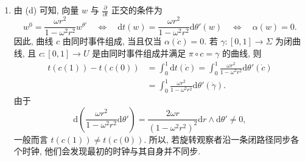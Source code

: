 \begin{description}[font=\normalfont,leftmargin=2em,labelwidth=1.5em]
\begin{enumerate}[label=(\alph*),ref=\alph*,leftmargin=*]
\item 由 (d) 可知, 向量 $w$ 与 $\frac{\partial}{\partial t}$ 正交的条件为
\[
  w^0=\frac{\omega r^2}{1-\omega^2r^2}w^{\theta'}
  \quad\Longleftrightarrow\quad \mathrm{d}t(w)=\frac{\omega r^2}{1-\omega^2r^2}\mathrm{d}\theta'(w)
  \quad\Longleftrightarrow\quad\alpha(w)=0.
\]
因此, 曲线 $c$ 由同时事件组成, 当且仅当 $\alpha(\dot c)=0$. 若 $\gamma:[0,1]\to\Sigma$ 为闭曲线, 且 $c:[0,1]\to U$ 是由同时事件组成并满足 $\pi\circ c=\gamma$ 的曲线, 则
\begin{align*}
  t(c(1))-t(c(0))
    &=\int_0^1\mathrm{d}t(\dot c)
      =\int_0^1\frac{\omega r^2}{1-\omega^2r^2}\mathrm{d}\theta'(\dot c)\\
    &=\int_0^1\frac{\omega r^2}{1-\omega^2r^2}\mathrm{d}\theta'(\dot\gamma).
\end{align*}
由于
\[
  \mathrm{d}\left(\frac{\omega r^2}{1-\omega^2r^2}\mathrm{d}\theta'\right)
  =\frac{2\omega r}{(1-\omega^2r^2)^2}\mathrm{d}r\wedge\mathrm{d}\theta'\ne 0,
\]
一般而言 $t(c(1))\ne t(c(0))$. 所以, 若旋转观察者沿一条闭路径同步各个时钟, 他们会发现最初的时钟与其自身并不同步.
\end{enumerate}
\end{description}
